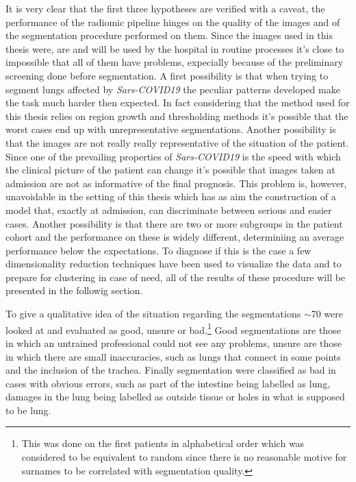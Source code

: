 It is very clear that the first three hypotheses are verified with a caveat, the performance of the radiomic pipeline hinges on the quality of the images and of the segmentation procedure performed on them. Since the images used in this thesis were, are and will be used by the hospital in routine processes it's close to impossible that all of them have problems, expecially because of the preliminary screening done before segmentation.
A first possibility is that when trying to segment lungs affected by \textit{Sars-COVID19} the peculiar patterns developed make the task much harder then expected.
In fact considering that the method used for this thesis relies on region growth and thresholding methods it's possible that the worst cases end up with unrepresentative segmentations.
Another possibility is that the images are not really really representative of the situation of the patient. Since one of the prevailing properties of \textit{Sars-COVID19} is the speed with which the clinical picture of the patient can change it's possible that images taken at admission are not as informative of the final prognosis. This problem is, however, unavoidable in the setting of this thesis which has as aim the construction of a model that, exactly at admission, can discriminate between serious and easier cases.
Another possibility is that there are two or more subgroups in the patient cohort and the performance on these is widely different, determiniing an average performance below the expectations.
To diagnose if this is the case a few dimensionality reduction techniques have been used to visualize the data and to prepare for clustering in case of need, all of the results of these procedure will be presented in the followig section.	

To give a qualitative idea of the situation regarding the segmentations $\sim$70 were looked at and evaluated as good, unsure or bad.\footnote{This was done on the first patients in alphabetical order which was considered to be equivalent to random since there is no reasonable motive for surnames to be correlated with segmentation quality.}
Good segmentations are those in which an untrained professional could not see any problems, unsure are those in which there are small inaccuracies, such as lungs that connect in some points and the inclusion of the trachea. 
Finally segmentation were classified as bad in cases with obvious errors, such as part of the intestine being labelled as lung, damages in the lung being labelled as outside tissue or holes in what is supposed to be lung.

